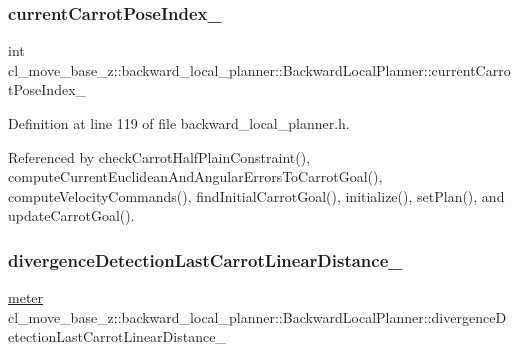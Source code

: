\subsubsection{\texorpdfstring{current\+Carrot\+Pose\+Index\+\_\+}{currentCarrotPoseIndex\_}}
{\footnotesize\ttfamily int cl\+\_\+move\+\_\+base\+\_\+z\+::backward\+\_\+local\+\_\+planner\+::\+Backward\+Local\+Planner\+::current\+Carrot\+Pose\+Index\+\_\+\hspace{0.3cm}{\ttfamily [private]}}



Definition at line 119 of file backward\+\_\+local\+\_\+planner.\+h.



Referenced by check\+Carrot\+Half\+Plain\+Constraint(), compute\+Current\+Euclidean\+And\+Angular\+Errors\+To\+Carrot\+Goal(), compute\+Velocity\+Commands(), find\+Initial\+Carrot\+Goal(), initialize(), set\+Plan(), and update\+Carrot\+Goal().

\mbox{\label{classcl__move__base__z_1_1backward__local__planner_1_1BackwardLocalPlanner_a3187b3b0c9a640133556efd056f2e736}} 
\subsubsection{\texorpdfstring{divergence\+Detection\+Last\+Carrot\+Linear\+Distance\+\_\+}{divergenceDetectionLastCarrotLinearDistance\_}}
{\footnotesize\ttfamily \hyperlink{backward__local__planner_8h_ab6024a26b088c11b8a5218a469ae5a57}{meter} cl\+\_\+move\+\_\+base\+\_\+z\+::backward\+\_\+local\+\_\+planner\+::\+Backward\+Local\+Planner\+::divergence\+Detection\+Last\+Carrot\+Linear\+Distance\+\_\+\hspace{0.3cm}{\ttfamily [private]}}



